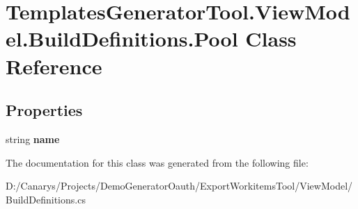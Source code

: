 \hypertarget{class_templates_generator_tool_1_1_view_model_1_1_build_definitions_1_1_pool}{}\section{Templates\+Generator\+Tool.\+View\+Model.\+Build\+Definitions.\+Pool Class Reference}
\label{class_templates_generator_tool_1_1_view_model_1_1_build_definitions_1_1_pool}
\subsection*{Properties}
\begin{DoxyCompactItemize}
\item 
\mbox{\label{class_templates_generator_tool_1_1_view_model_1_1_build_definitions_1_1_pool_a13e69b3173e003ebd795b2e2db16e13f}} 
string {\bfseries name}
\end{DoxyCompactItemize}


The documentation for this class was generated from the following file\+:\begin{DoxyCompactItemize}
\item 
D\+:/\+Canarys/\+Projects/\+Demo\+Generator\+Oauth/\+Export\+Workitems\+Tool/\+View\+Model/Build\+Definitions.\+cs\end{DoxyCompactItemize}
